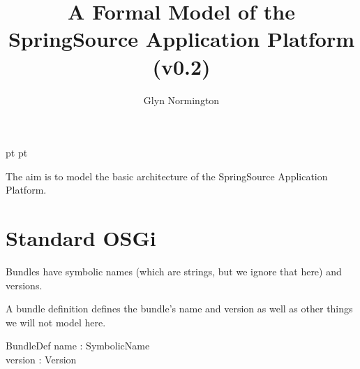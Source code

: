 \documentclass[a4paper]{article}
\begin{document}
 pt
 pt

\title{A Formal Model of the SpringSource Application Platform (v0.2)}
\author{Glyn Normington}
\maketitle
\thispagestyle{myheadings}
\setcounter{page}{0}

The aim is to model the basic architecture of the SpringSource Application Platform.

\clearpage
{}
\tableofcontents

\newcommand{\true}{true}
\newcommand{\false}{false}
\renewcommand{\empty}{\emptyset}
\newcommand{\ModuleDefZero}{ModuleDef_0}
\newcommand{\ModuleDefOne}{ModuleDef_1}
\newcommand{\ModuleDefTwo}{ModuleDef_2}
\newcommand{\ModuleDefThree}{ModuleDef_3}
\newcommand{\ModuleDefFour}{ModuleDef_4}

%
%
\clearpage
{}
\section{Standard OSGi}
\label{cha:standardosgi}

Bundles have symbolic names (which are strings, but we ignore that here) and versions.
\begin{zed}
\end{zed}

A bundle definition defines the bundle's name and version as well as other things we will not model here.
\begin{schema}{BundleDef}
 name : SymbolicName \\
 version : Version \\
\end{schema}
\end{document}
